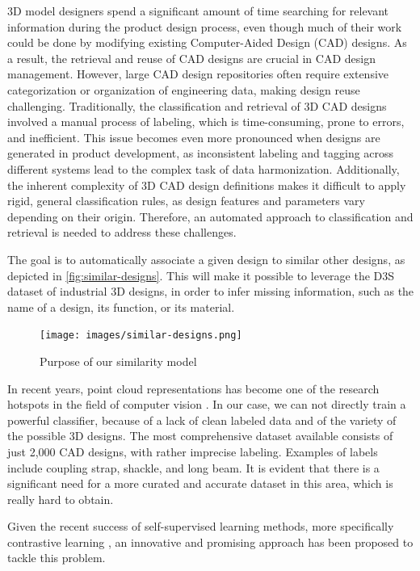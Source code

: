 3D model designers spend a significant amount of time searching for relevant information during the product design process, even though much of their work could be done by modifying existing Computer-Aided Design (CAD) designs. As a result, the retrieval and reuse of CAD designs are crucial in CAD design management. However, large CAD design repositories often require extensive categorization or organization of engineering data, making design reuse challenging. Traditionally, the classification and retrieval of 3D CAD designs involved a manual process of labeling, which is time-consuming, prone to errors, and inefficient. This issue becomes even more pronounced when designs are generated in product development, as inconsistent labeling and tagging across different systems lead to the complex task of data harmonization. Additionally, the inherent complexity of 3D CAD design definitions makes it difficult to apply rigid, general classification rules, as design features and parameters vary depending on their origin. Therefore, an automated approach to classification and retrieval is needed to address these challenges.

The goal is to automatically associate a given design to similar other designs, as depicted in \autoref{fig:similar-designs}. This will make it possible to leverage the D3S dataset of industrial 3D designs, in order to infer missing information, such as the name of a design, its function, or its material.

\begin{figure}[]
    \centering
    \texttt{[image: images/similar-designs.png]}
    \caption{Purpose of our similarity model}
    \label{fig:similar-designs}
\end{figure}

In recent years, point cloud representations has become one of the research hotspots in the field of computer vision \cite{zhangDeepLearningbased3D2023}.
In our case, we can not directly train a powerful classifier, because of a lack of clean labeled data and of the variety of the possible 3D designs.
The most comprehensive dataset available consists of just 2,000 CAD designs, with rather imprecise labeling. Examples of labels include coupling strap, shackle, and long beam. It is evident that there is a significant need for a more curated and accurate dataset in this area, which is really hard to obtain.

Given the recent success of self-supervised learning methods, more specifically contrastive learning \cite{radfordLearningTransferableVisual2021,yuPointBERTPretraining3D2022,liuOpenShapeScaling3D2023}, an innovative and promising approach has been proposed to tackle this problem.

